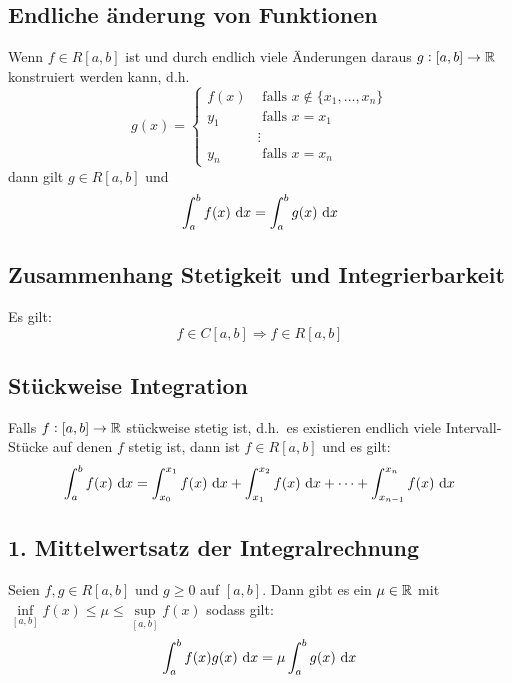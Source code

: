\subsection{Endliche änderung von Funktionen}
Wenn $f \in R[a, b]$ ist und durch endlich viele Änderungen daraus
$g: [a,b] \rightarrow \mathbb{R}$ konstruiert werden kann, d.h.
\begin{equation*}
    g(x) =
    \begin{cases}
        f(x) &\text{ falls } x \notin \{x_1, \ldots, x_n \} \\
        y_1 &\text{ falls } x=x_1\\
        &   \vdots \\
        y_n &\text{ falls } x=x_n
    \end{cases}
\end{equation*}
dann gilt $g \in R[a, b]$ und
\begin{equation*}
    \int_a^b f(x) \text{ d}x = \int_a^b g(x) \text{ d}x
\end{equation*}

\subsection{Zusammenhang Stetigkeit und Integrierbarkeit}
Es gilt:
\begin{equation*}
    f \in C[a, b] \Rightarrow f \in R[a, b]
\end{equation*}

\subsection{Stückweise Integration}
Falls $f: [a, b] \rightarrow \mathbb{R}$ stückweise stetig ist, d.h.\ es existieren
endlich viele Intervall-Stücke auf denen $f$ stetig ist, dann ist
$f \in R[a,b]$ und es gilt:
\begin{equation*}
    \int_a^b f(x) \text{ d}x = \int_{x_0}^{x_1} f(x) \text{ d}x + \int_{x_1}^{x_2} f(x) \text{ d}x
    + \cdots + \int_{x_{n-1}}^{x_n} f(x) \text{ d}x
\end{equation*}

\subsection{1. Mittelwertsatz der Integralrechnung}
Seien $f, g \in R[a,b]$ und $g \geq 0$ auf $[a, b]$. Dann gibt es ein $\mu \in \mathbb{R}$
mit $\inf\limits_{[a,b]} f(x) \leq \mu \leq \sup\limits_{[a,b]} f(x)$ sodass gilt:
\begin{equation*}
    \int_a^b f(x)g(x)\text{ d}x = \mu \int_a^b g(x) \text{ d}x
\end{equation*}

